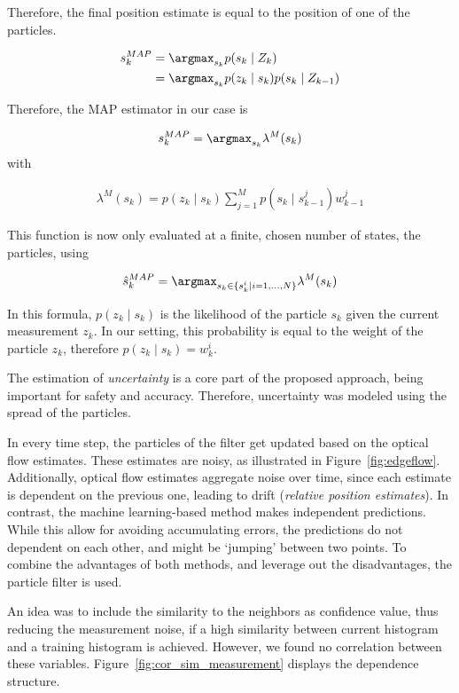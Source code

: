 Therefore, the final position estimate is equal to the position of one
of the particles.

\begin{align}
  s_k^{MAP}  &= \argmax_{s_k}{p(s_k \mid Z_k)}\\
             &= \argmax_{s_k}{p(z_k \mid s_k) p(s_k \mid Z_{k-1})} 
\end{align}

Therefore, the MAP estimator in our case is

\begin{align}
s_k^{MAP} = \argmax_{s_k} \lambda^M(s_k)
\end{align}
with

\begin{align}
\lambda^M(s_k) = p(z_k \mid s_k) \sum_{j=1}^Mp(s_k \mid s_{k-1}^j)w^j_{k-1}
\end{align}

This function is now only evaluated at a finite, chosen number of
states, the particles, using

\begin{align}
\hat{s}_k^{MAP} = \argmax_{s_k \in \{s_k^i \mid i=1,\ldots,N\}} \lambda^M(s_k)
\end{align}

In this formula, $p(z_k \mid s_k)$ is the likelihood of the particle
$s_k$ given the current measurement $z_k$. In our setting, this
probability is equal to the weight of the particle $z_k$, therefore
$p(z_k \mid s_k) = w^i_k$.

The estimation of \emph{uncertainty} is a core part of the proposed
approach, being important for safety and accuracy. Therefore,
uncertainty was modeled using the spread of the particles.

In every time step, the particles of the filter get updated based on
the optical flow estimates. These estimates are noisy, as illustrated
in Figure~\ref{fig:edgeflow}. Additionally, optical flow estimates
aggregate noise over time, since each estimate is dependent on the
previous one, leading to drift (\emph{relative position
  estimates}). In contrast, the machine learning-based method makes
independent predictions. While this allow for avoiding accumulating
errors, the predictions do not dependent on each other, and might be
`jumping' between two points. To combine the advantages of both
methods, and leverage out the disadvantages, the particle filter is
used.

An idea was to include the similarity to the neighbors as confidence
value, thus reducing the measurement noise, if a high similarity
between current histogram and a training histogram is
achieved. However, we found no correlation between these
variables. Figure~\ref{fig:cor_sim_measurement} displays the
dependence structure.

